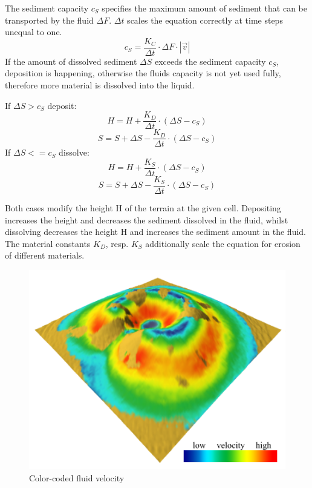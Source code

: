 The sediment capacity $c_S$ specifies the maximum amount of sediment that can be transported by the fluid $\Delta F$. $\Delta t$ scales the equation correctly at time steps unequal to one.  
$$ c_S = \frac{K_C}{\Delta t} \cdot \Delta F  \cdot |\vec{v}|
$$
If the amount of dissolved sediment $\Delta S$ exceeds the sediment capacity $c_S$, deposition is happening, otherwise the fluids capacity is not yet used fully, therefore more material is dissolved into the liquid. 

If $\Delta S > c_S$ deposit: 
$$
H = H + \frac{K_D}{\Delta t} \cdot ( \Delta S - c_S )
$$
$$
S = S + \Delta S - \frac{K_D}{\Delta t} \cdot (\Delta S - c_S)
$$
If $\Delta S <= c_S$ dissolve: 
$$
H = H + \frac{K_S}{\Delta t} \cdot ( \Delta S - c_S )
$$
$$
S = S + \Delta S - \frac{K_S}{\Delta t} \cdot (\Delta S - c_S)
$$

Both cases modify the height H of the terrain at the given cell. Depositing increases the height and decreases the sediment dissolved in the fluid, whilst dissolving decreases the height H and increases the sediment amount in the fluid. The material constants $K_D$, resp. $K_S$ additionally scale the equation for erosion of different materials. 

\begin{figure}
	\centering
	\includegraphics[width=\linewidth]{NWD05/hydraulic_errosion_c}
	\caption{Color-coded fluid velocity}
	\label{fig:fluid_velocity}
\end{figure}

